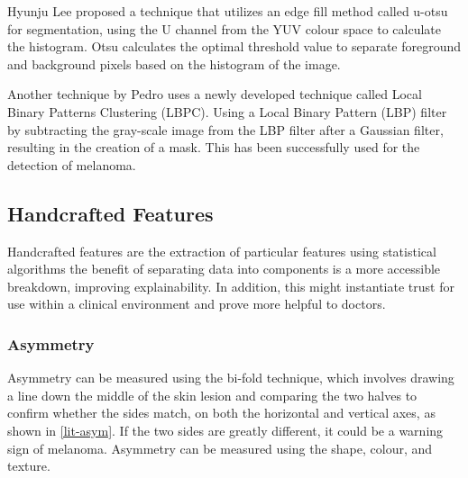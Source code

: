 Hyunju Lee\cite{Lee2020} proposed a technique that utilizes an edge fill method called u-otsu for segmentation, using the U channel from the YUV colour space to calculate the histogram. Otsu calculates the optimal threshold value to separate foreground and background pixels based on the histogram of the image.

Another technique by Pedro\cite{Pereira2020} uses a newly developed technique called Local Binary Patterns Clustering (LBPC). Using a Local Binary Pattern (LBP) filter by subtracting the gray-scale image from the LBP filter after a Gaussian filter, resulting in the creation of a mask. This has been successfully used for the detection of melanoma.

\subsection{Handcrafted Features}
Handcrafted features are the extraction of particular features using statistical algorithms the benefit of separating data into components is a more accessible breakdown, improving explainability. In addition, this might instantiate trust for use within a clinical environment and prove more helpful to doctors.

\subsubsection{Asymmetry}
Asymmetry can be measured using the bi-fold technique, which involves drawing a line down the middle of the skin lesion and comparing the two halves to confirm whether the sides match, on both the horizontal and vertical axes, as shown in \ref{lit-asym}. If the two sides are greatly different, it could be a warning sign of melanoma. Asymmetry can be measured using the shape\cite{Zaqout2016}, colour\cite{Kasmi2016}, and texture\cite{Ali2020a}.

